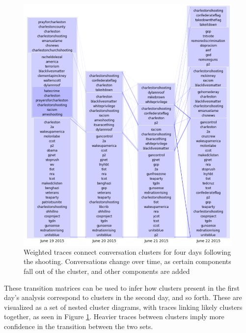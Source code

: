 \documentclass[12pt]{article}
\begin{document}
\begin{figure}[!ht]
  \centering
    \includegraphics[width=1.0\textwidth]{F7_multi_day_cluster.png}
    \caption{Weighted  traces  connect  conversation  clusters  for  four  days  following  the  shooting. Conversations change over time, as certain components fall out of the cluster, and other components are added}
  \label{fig:multi_day_cluster}
\end{figure}

These transition matrices can be used to infer how clusters present in the first day's analysis correspond to clusters in the second day, and so forth. These are visualized as a set of nested cluster diagrams, with traces linking likely clusters together, as seen in Figure \ref{fig:multi_day_cluster}. Heavier traces between clusters imply more confidence in the transition between the two sets.
\end{document}
